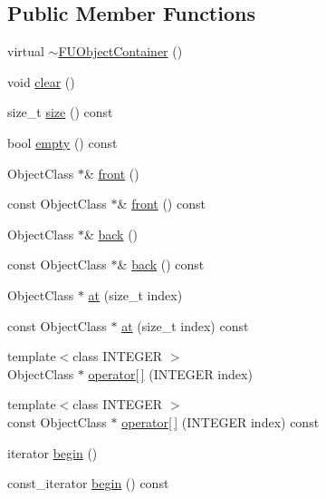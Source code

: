 \subsection*{Public Member Functions}
\begin{DoxyCompactItemize}
\item 
virtual \hyperlink{classFUObjectContainer_a2536f916c73734766a0d5384c8b4e4fa}{$\sim$FUObjectContainer} ()
\item 
void \hyperlink{classFUObjectContainer_a6a5de13497a54059c8e64eeb0c7d4649}{clear} ()
\item 
size\_\-t \hyperlink{classFUObjectContainer_af113112622cecb6303ad80c9638581cd}{size} () const 
\item 
bool \hyperlink{classFUObjectContainer_ade02770e2fb1c1584756f7397e6217c1}{empty} () const 
\item 
ObjectClass $\ast$\& \hyperlink{classFUObjectContainer_a31bb811b878d95c6be48813e54b576eb}{front} ()
\item 
const ObjectClass $\ast$\& \hyperlink{classFUObjectContainer_a0492e4bbed66840780ed99fb39aca04c}{front} () const 
\item 
ObjectClass $\ast$\& \hyperlink{classFUObjectContainer_a706056bc564047b69ee3921402f17d5c}{back} ()
\item 
const ObjectClass $\ast$\& \hyperlink{classFUObjectContainer_a5b996cbc75ccca1f3251323eb528a634}{back} () const 
\item 
ObjectClass $\ast$ \hyperlink{classFUObjectContainer_ac03e95b5bb925d980a08fe87ea580d17}{at} (size\_\-t index)
\item 
const ObjectClass $\ast$ \hyperlink{classFUObjectContainer_ae7ab424e108015d69d2cace86e9f47b0}{at} (size\_\-t index) const 
\item 
{\footnotesize template$<$class INTEGER $>$ }\\ObjectClass $\ast$ \hyperlink{classFUObjectContainer_a930075fdd29acb874cacaf3f4a31cde1}{operator\mbox{[}$\,$\mbox{]}} (INTEGER index)
\item 
{\footnotesize template$<$class INTEGER $>$ }\\const ObjectClass $\ast$ \hyperlink{classFUObjectContainer_a9ccb9a78dc99bfed9a003d289b20cbc6}{operator\mbox{[}$\,$\mbox{]}} (INTEGER index) const 
\item 
iterator \hyperlink{classFUObjectContainer_afec7bfee54ac21da128ef9726b45895f}{begin} ()
\item 
const\_\-iterator \hyperlink{classFUObjectContainer_ac94e733aeaa214ebfc83a2266893a217}{begin} () const 

\end{DoxyCompactItemize}
